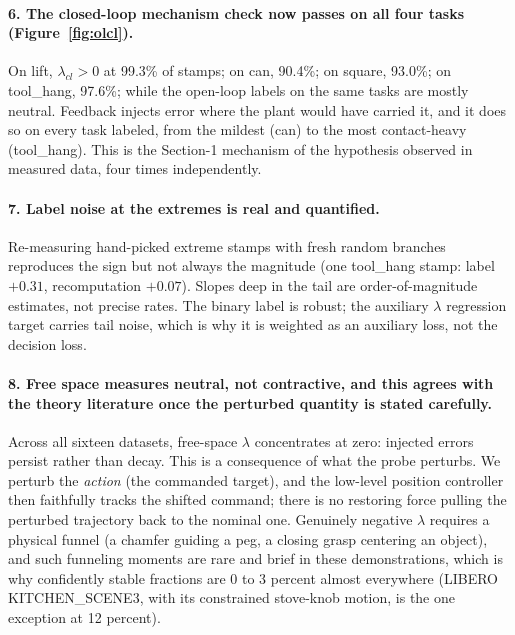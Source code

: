 \documentclass[11pt]{article}
\begin{document}
\paragraph{6. The closed-loop mechanism check now passes on all four tasks
(Figure~\ref{fig:olcl}).} On lift, $\lambda_{cl} > 0$ at 99.3\% of stamps; on can,
90.4\%; on square, 93.0\%; on tool\_hang, 97.6\%; while the open-loop labels on
the same tasks are mostly neutral. Feedback injects error where the plant would
have carried it, and it does so on every task labeled, from the mildest (can) to
the most contact-heavy (tool\_hang). This is the Section-1 mechanism of the
hypothesis observed in measured data, four times independently.

\paragraph{7. Label noise at the extremes is real and quantified.} Re-measuring
hand-picked extreme stamps with fresh random branches reproduces the sign but not
always the magnitude (one tool\_hang stamp: label $+0.31$, recomputation $+0.07$).
Slopes deep in the tail are order-of-magnitude estimates, not precise rates. The
binary label is robust; the auxiliary $\lambda$ regression target carries tail
noise, which is why it is weighted as an auxiliary loss, not the decision loss.

\paragraph{8. Free space measures neutral, not contractive, and this agrees with
the theory literature once the perturbed quantity is stated carefully.} Across all
sixteen datasets, free-space $\lambda$ concentrates at zero: injected errors
persist rather than decay. This is a consequence of what the probe perturbs. We
perturb the \emph{action} (the commanded target), and the low-level position
controller then faithfully tracks the shifted command; there is no restoring force
pulling the perturbed trajectory back to the nominal one. Genuinely negative
$\lambda$ requires a physical funnel (a chamfer guiding a peg, a closing grasp
centering an object), and such funneling moments are rare and brief in these
demonstrations, which is why confidently stable fractions are 0 to 3 percent
almost everywhere (LIBERO KITCHEN\_SCENE3, with its constrained stove-knob motion,
is the one exception at 12 percent).
\end{document}

